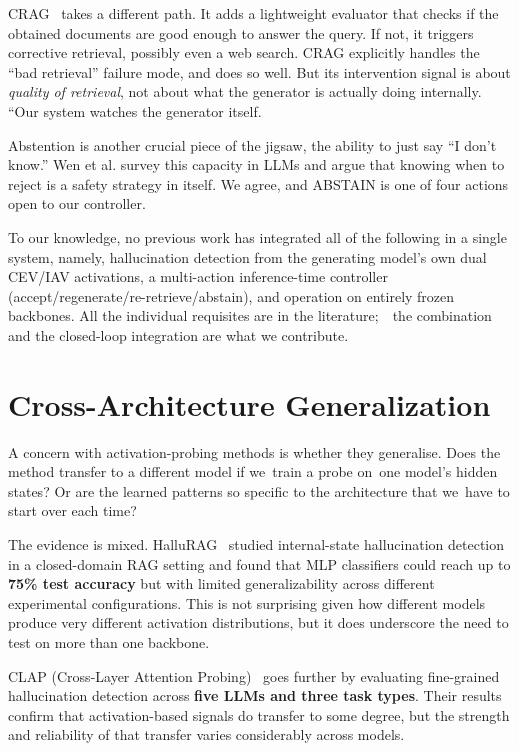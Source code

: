 CRAG~\cite{yan2024crag} takes a different path. It adds a lightweight evaluator that checks if the obtained documents are good enough to answer the query. If not, it triggers corrective retrieval, possibly even a web search. CRAG explicitly handles the “bad retrieval” failure mode, and does so well. But its intervention signal is about \emph{quality of retrieval}, not about what the generator is actually doing internally. “Our system watches the generator itself.

Abstention is another crucial piece of the jigsaw, the ability to just say ``I don't know.'' Wen et al. \cite{wen2024abstention} survey this capacity in LLMs and argue that knowing when to reject is a safety strategy in itself. We agree, and ABSTAIN is one of four actions open to our controller.

To our knowledge, no previous work has integrated all of the following in a single system, namely, hallucination detection from the generating model's own dual CEV/IAV activations, a multi-action inference-time controller (accept/regenerate/re-retrieve/abstain), and operation on entirely frozen backbones. All the individual requisites are in the literature;  the combination and the closed-loop integration are what we contribute.

\section{Cross-Architecture Generalization}
\label{sec:lit_crossarch}

A concern with activation-probing methods is whether they generalise. Does the method transfer to a different model if we train a probe on one model's hidden states? Or are the learned patterns so specific to the architecture that we have to start over each time?

The evidence is mixed. HalluRAG~\cite{frohling2024hallurag} studied internal-state hallucination detection in a closed-domain RAG setting and found that MLP classifiers could reach up to \textbf{75\% test accuracy} but with limited generalizability across different experimental configurations. This is not surprising given how different models produce very different activation distributions, but it does underscore the need to test on more than one backbone.

CLAP (Cross-Layer Attention Probing)~\cite{zhao2024clap} goes further by evaluating fine-grained hallucination detection across \textbf{five LLMs and three task types}. Their results confirm that activation-based signals do transfer to some degree, but the strength and reliability of that transfer varies considerably across models.

